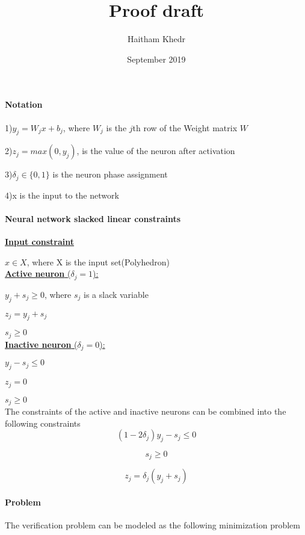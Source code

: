 \documentclass{article}
\title{Proof draft}
\author{Haitham Khedr }
\date{September 2019}
\begin{document}
\maketitle

\paragraph{Notation}\noindent

1)$y_j =W_jx + b_j$, where $W_j$ is the $j$th row of the Weight matrix $W$

2)$z_j = max(0,y_j)$, is the value of the neuron after activation

3)$\delta_j\in{\{0,1\}}$ is the neuron phase assignment

4)x is the input to the network

\paragraph{Neural network slacked linear constraints\\} \noindent

\underline{\textbf{Input constraint}}

$x\in X$, where X is the input set(Polyhedron)\\

\underline{\textbf{Active neuron} (\emph{$\delta_j = 1$}):}

$y_j + s_j \geq 0$, where $ s_j$ is a slack variable

$z_j = y_j + s_j $

$s_j \geq 0$\\

\underline{\textbf{Inactive neuron} (\emph{$\delta_j = 0$}):}

$y_j - s_j \leq 0$

$z_j =0$

$s_j \geq 0$\\

The constraints of the active and inactive neurons can be combined into the following constraints
$$(1-2\delta_j)y_j - s_j \leq 0$$

$$s_j \geq 0$$

$$z_j = \delta_j(y_j +s_j)$$
\newpage
\paragraph{Problem\\} 

The verification problem can be modeled as the following minimization problem
\end{document}
